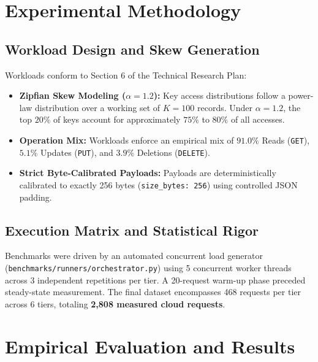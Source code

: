 \documentclass[conference]{IEEEtran}
\begin{document}
\section{Experimental Methodology}

\subsection{Workload Design and Skew Generation}
Workloads conform to Section 6 of the Technical Research Plan:
\begin{itemize}
    \item \textbf{Zipfian Skew Modeling ($\alpha = 1.2$):} Key access distributions follow a power-law distribution over a working set of $K = 100$ records. Under $\alpha = 1.2$, the top $20\%$ of keys account for approximately $75\%$ to $80\%$ of all accesses.
    \item \textbf{Operation Mix:} Workloads enforce an empirical mix of $91.0\%$ Reads (\texttt{GET}), $5.1\%$ Updates (\texttt{PUT}), and $3.9\%$ Deletions (\texttt{DELETE}).
    \item \textbf{Strict Byte-Calibrated Payloads:} Payloads are deterministically calibrated to exactly 256 bytes (\texttt{size\_bytes: 256}) using controlled JSON padding.
\end{itemize}

\subsection{Execution Matrix and Statistical Rigor}
Benchmarks were driven by an automated concurrent load generator (\texttt{benchmarks/runners/orchestrator.py}) using 5 concurrent worker threads across 3 independent repetitions per tier. A 20-request warm-up phase preceded steady-state measurement. The final dataset encompasses 468 requests per tier across 6 tiers, totaling \textbf{2,808 measured cloud requests}.

\section{Empirical Evaluation and Results}
\end{document}
